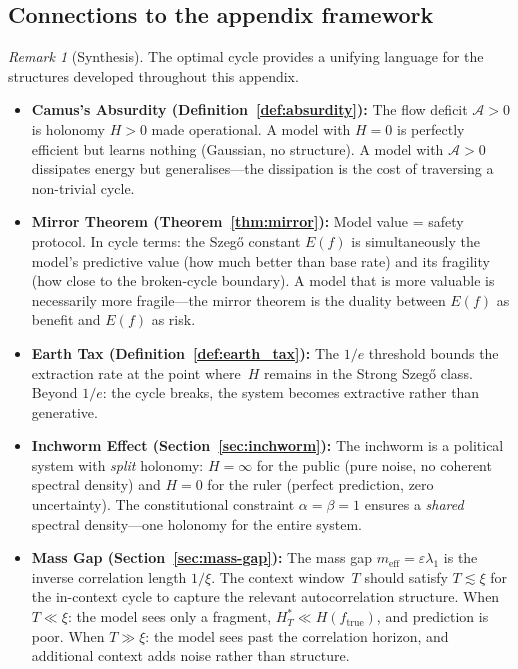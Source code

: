 \documentclass[11pt,a4paper]{article}
\theoremstyle{definition}
\theoremstyle{remark}
\newtheorem{remark}[theorem]{Remark}
\begin{document}
\subsection*{Connections to the appendix framework}

\begin{remark}[Synthesis]\label{rmk:oc-llm-synthesis}
The optimal cycle provides a unifying language for the structures
developed throughout this appendix.

\begin{itemize}[nosep]
\item \textbf{Camus's Absurdity
  (Definition~\ref{def:absurdity}):}
  The flow deficit $\mathcal{A} > 0$ is holonomy $H > 0$ made
  operational.
  A model with $H = 0$ is perfectly efficient but learns nothing
  (Gaussian, no structure).
  A model with $\mathcal{A} > 0$ dissipates energy but
  generalises---the dissipation is the cost of traversing a
  non-trivial cycle.

\item \textbf{Mirror Theorem (Theorem~\ref{thm:mirror}):}
  Model value = safety protocol.
  In cycle terms: the Szeg\H{o} constant $E(f)$ is simultaneously
  the model's predictive value (how much better than base rate)
  and its fragility (how close to the broken-cycle boundary).
  A model that is more valuable is necessarily more fragile---the
  mirror theorem is the duality between $E(f)$ as benefit and
  $E(f)$ as risk.

\item \textbf{Earth Tax (Definition~\ref{def:earth_tax}):}
  The $1/e$ threshold bounds the extraction rate at the point
  where~$H$ remains in the Strong Szeg\H{o} class.
  Beyond $1/e$: the cycle breaks, the system becomes extractive
  rather than generative.

\item \textbf{Inchworm Effect (Section~\ref{sec:inchworm}):}
  The inchworm is a political system with \emph{split}
  holonomy: $H = \infty$ for the public (pure noise, no
  coherent spectral density) and $H = 0$ for the ruler
  (perfect prediction, zero uncertainty).
  The constitutional constraint $\alpha = \beta = 1$ ensures
  a \emph{shared} spectral density---one holonomy for the
  entire system.

\item \textbf{Mass Gap (Section~\ref{sec:mass-gap}):}
  The mass gap $m_{\mathrm{eff}} = \varepsilon\lambda_1$ is
  the inverse correlation length $1/\xi$.
  The context window~$T$ should satisfy $T \lesssim \xi$ for
  the in-context cycle to capture the relevant autocorrelation
  structure.
  When $T \ll \xi$: the model sees only a fragment,
  $H_T^* \ll H(f_{\mathrm{true}})$, and prediction is poor.
  When $T \gg \xi$: the model sees past the correlation
  horizon, and additional context adds noise rather than
  structure.
\end{itemize}
\end{remark}
\end{document}
